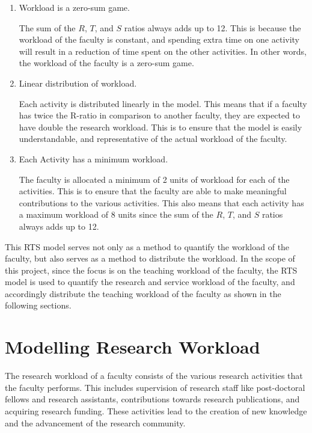 \begin{enumerate}
  \item Workload is a zero-sum game.

        The sum of the $R$, $T$, and $S$ ratios always adds up to 12. This is because the workload of the faculty is constant, and spending extra time on one activity will result in a reduction of time spent on the other activities. In other words, the workload of the faculty is a zero-sum game.

  \item Linear distribution of workload.

        Each activity is distributed linearly in the model. This means that if a faculty has twice the R-ratio in comparison to another faculty, they are expected to have double the research workload. This is to ensure that the model is easily understandable, and representative of the actual workload of the faculty.

  \item Each Activity has a minimum workload.

        The faculty is allocated a minimum of 2 units of workload for each of the activities. This is to ensure that the faculty are able to make meaningful contributions to the various activities. This also means that each activity has a maximum workload of 8 units since the sum of the $R$, $T$, and $S$ ratios always adds up to 12.

\end{enumerate}

This RTS model serves not only as a method to quantify the workload of the faculty, but also serves as a method to distribute the workload. In the scope of this project, since the focus is on the teaching workload of the faculty, the RTS model is used to quantify the research and service workload of the faculty, and accordingly distribute the teaching workload of the faculty as shown in the following sections.


\section{Modelling Research Workload}
\label{sec:modelling_research_workload}

The research workload of a faculty consists of the various research activities that the faculty performs. This includes supervision of research staff like post-doctoral fellows and research assistants, contributions towards research publications, and acquiring research funding. These activities lead to the creation of new knowledge and the advancement of the research community.

